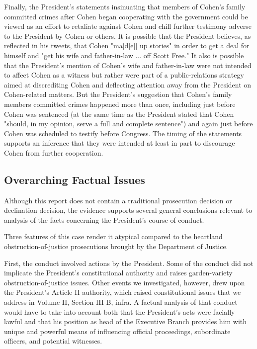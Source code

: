 Finally, the President's statements insinuating that members of Cohen's family committed crimes after Cohen began cooperating with the government could be viewed as an effort to retaliate against Cohen and chill further testimony adverse to the President by Cohen or others.
It is possible that the President believes, as reflected in his tweets, that Cohen "ma[d]e[] up stories" in order to get a deal for himself and "get his wife and father-in-law ... off Scott Free." It also is possible that the President's mention of Cohen's wife and father-in-law were not intended to affect Cohen as a witness but rather were part of a public-relations strategy aimed at discrediting Cohen and deflecting attention away from the President on Cohen-related matters.
But the President's suggestion that Cohen's family members committed crimes happened more than once, including just before Cohen was sentenced (at the same time as the President stated that Cohen "should, in my opinion, serve a full and complete sentence") and again just before Cohen was scheduled to testify before Congress.
The timing of the statements supports an inference that they were intended at least in part to discourage Cohen from further cooperation.

\subsection{Overarching Factual Issues}

Although this report does not contain a traditional prosecution decision or declination decision, the evidence supports several general conclusions relevant to analysis of the facts concerning the President's course of conduct.

Three features of this case render it atypical compared to the heartland obstruction-of-justice prosecutions brought by the Department of Justice.

First, the conduct involved actions by the President.
Some of the conduct did not implicate the President's constitutional authority and raises garden-variety obstruction-of-justice issues.
Other events we investigated, however, drew upon the President's Article II authority, which raised constitutional issues that we address in Volume II, Section III-B, infra.
A factual analysis of that conduct would have to take into account both that the President's acts were facially lawful and that his position as head of the Executive Branch provides him with unique and powerful means of influencing official proceedings, subordinate officers, and potential witnesses.

